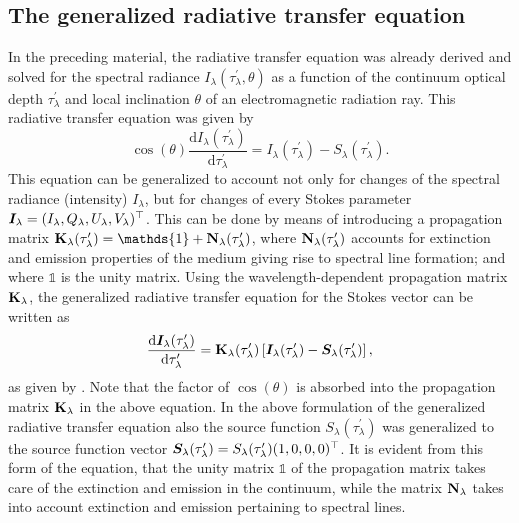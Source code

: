 \documentclass[a4paper,12pt]{report}
\begin{document}
\subsection{The generalized radiative transfer equation}
In the preceding material, the radiative transfer equation was already derived and solved for the spectral radiance $I_\lambda(\tau_\lambda^\prime, \theta)$ as a function of the continuum optical depth $\tau_\lambda^\prime$ and local inclination $\theta$ of an electromagnetic radiation ray. This radiative transfer equation was given by \begin{equation}
\cos(\theta)\frac{\mathrm{d}I_\lambda(\tau_\lambda^\prime)}{\mathrm{d}\tau_\lambda^\prime} = I_\lambda(\tau_\lambda^\prime)-S_\lambda(\tau_\lambda^\prime).
\end{equation} This equation can be generalized to account not only for changes of the spectral radiance (intensity) $I_\lambda$, but for changes of every Stokes parameter $\bm{I}_\lambda = (I_\lambda, Q_\lambda, U_\lambda, V_\lambda)^\top$. This can be done by means of introducing a propagation matrix $\matr{K}_\lambda(\tau_\lambda^\prime) = \mathds{1} + \matr{N}_\lambda(\tau_\lambda^\prime)$, where $\boldsymbol{\mathbf{N}}_\lambda(\tau_\lambda^\prime)$ accounts for extinction and emission properties of the medium giving rise to spectral line formation; and where $\mathds{1}$ is the unity matrix. Using the wavelength-dependent propagation matrix $\boldsymbol{\mathbf{K}}_\lambda$, the generalized radiative transfer equation for the Stokes vector can be written as \begin{equation}\label{eq:generalizedradtransfereq}
\frac{\mathrm{d}\bm{I}_\lambda(\tau_\lambda^\prime)}{\mathrm{d}\tau_\lambda^\prime} = \boldsymbol{\mathbf{K}}_\lambda(\tau_\lambda^\prime)\left[\bm{I}_\lambda(\tau_\lambda^\prime)-\bm{S}_\lambda(\tau_\lambda^\prime)\right],
\end{equation} as given by \cite[p.150]{delToroIniesta.2003}. Note that the factor of $\cos(\theta)$ is absorbed into the propagation matrix $\boldsymbol{\mathbf{K}}_\lambda$ in the above equation. In the above formulation of the generalized radiative transfer equation also the source function $S_\lambda(\tau_\lambda^\prime)$ was generalized to the source function vector $\bm{S}_\lambda(\tau_\lambda^\prime) = S_\lambda(\tau_\lambda^\prime)(1,0,0,0)^\top$. It is evident from this form of the equation, that the unity matrix $\mathds{1}$ of the propagation matrix takes care of the extinction and emission in the continuum, while the matrix $\boldsymbol{\mathbf{N}}_\lambda$ takes into account extinction and emission pertaining to spectral lines. 
\end{document}
